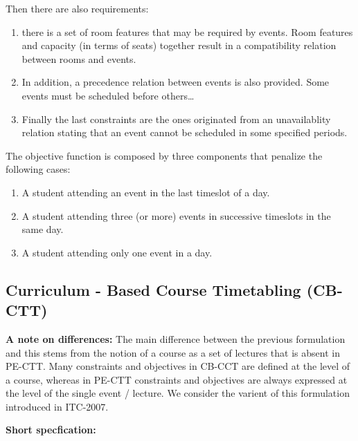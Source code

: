 \documentclass[11pt]{book}
\begin{document}
Then there are also requirements:
\begin{enumerate}
	\item there is a set of room features that may be required by events. Room features and capacity (in terms of seats) together result in a compatibility relation between rooms and events.

	\item In addition, a precedence relation between events is also provided. Some events must be scheduled before others\dots

	\item Finally the last constraints are the ones originated from an unavailablity relation stating that an event cannot be scheduled in some specified periods.
\end{enumerate}

The objective function is composed by three components that penalize the following cases: 
\begin{enumerate}
	\item A student attending an event in the last timeslot of a day. 
	\item A student attending three (or more) events in successive timeslots in the same day. 
	\item A student attending only one event in a day.
\end{enumerate}
\subsection{Curriculum - Based Course Timetabling (CB-CTT)}
\textbf{A note on differences:} The main difference between the previous formulation and this stems from the notion of a course as a set of lectures that is absent in PE-CTT. Many constraints and objectives in CB-CCT are defined at the level of a course, whereas in PE-CTT constraints and objectives are always expressed at the level of the single event / lecture. We consider the varient of this formulation introduced in ITC-2007.

\textbf{Short specfication:}
\end{document}

